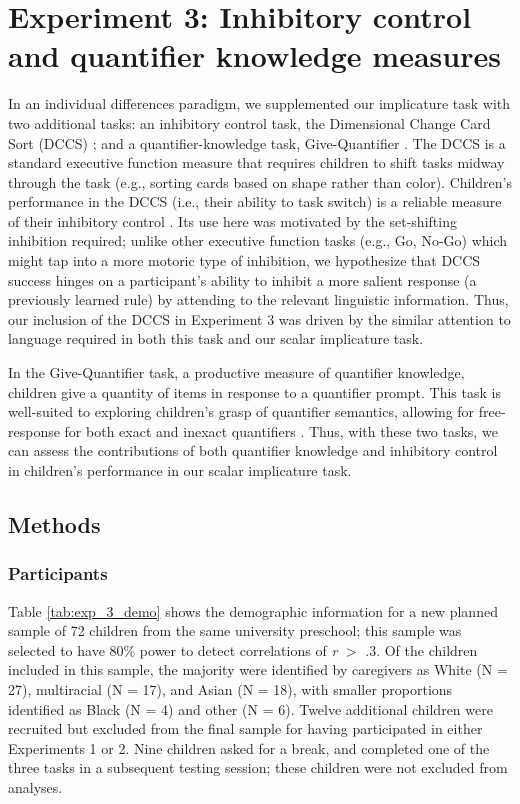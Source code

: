 \documentclass[man]{apa2}
\begin{document}
\section{Experiment 3: Inhibitory control and quantifier knowledge measures}

In an individual differences paradigm, we supplemented our implicature task with two additional tasks: an inhibitory control task, the Dimensional Change Card Sort (DCCS) \cite{zelazo2006}; and a quantifier-knowledge task, Give-Quantifier \cite{barner2009}. The DCCS is a standard executive function measure that requires children to shift tasks midway through the task (e.g., sorting cards based on shape rather than color). Children's performance in the DCCS (i.e., their ability to task switch) is a reliable measure of their inhibitory control \cite{zelazo2006}. Its use here was motivated by the set-shifting inhibition required; unlike other executive function tasks (e.g., Go, No-Go) which might tap into a more motoric type of inhibition, we hypothesize that DCCS success hinges on a participant's ability to inhibit a more salient response (a previously learned rule) by attending to the relevant linguistic information. Thus, our inclusion of the DCCS in Experiment 3 was driven by the similar attention to language required in both this task and our scalar implicature task.

In the Give-Quantifier task, a productive measure of quantifier knowledge, children give a quantity of items in response to a quantifier prompt. This task is well-suited to exploring children's grasp of quantifier semantics, allowing for free-response for both exact and inexact quantifiers \cite{barner2009}. Thus, with these two tasks, we can assess the contributions of both quantifier knowledge and inhibitory control in children's performance in our scalar implicature task.

\subsection{Methods}

\subsubsection{Participants}

Table \ref{tab:exp_3_demo} shows the demographic information for a new planned sample of 72 children from the same university preschool; this sample was selected to have 80\% power to detect correlations of \emph{r} $>$ .3. Of the children included in this sample, the majority were identified by caregivers as White (N = 27), multiracial (N = 17), and Asian (N = 18), with smaller proportions identified as Black (N = 4) and other (N = 6). Twelve additional children were recruited but excluded from the final sample for having participated in either Experiments 1 or 2. Nine children asked for a break, and completed one of the three tasks in a subsequent testing session; these children were not excluded from analyses.
\end{document}
